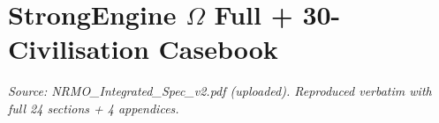 \part{StrongEngine $\Omega$ Full + 30-Civilisation Casebook}
\noindent\textit{Source: NRMO\_Integrated\_Spec\_v2.pdf
(uploaded). Reproduced verbatim with full 24 sections + 4 appendices.}


